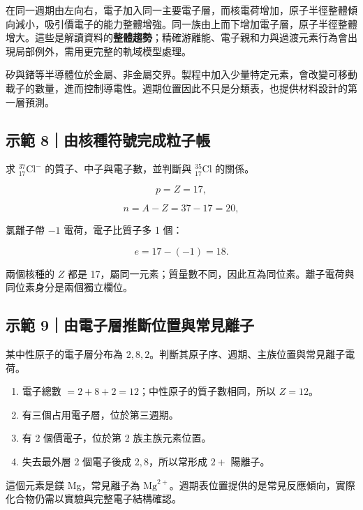 \documentclass[11pt,a4paper]{article}
\providecommand{\tightlist}{%
  \setlength{\itemsep}{0pt}\setlength{\parskip}{0pt}}
\begin{document}
在同一週期由左向右，電子加入同一主要電子層，而核電荷增加，原子半徑整體傾向減小，吸引價電子的能力整體增強。同一族由上而下增加電子層，原子半徑整體增大。這些是解讀資料的\textbf{整體趨勢}；精確游離能、電子親和力與過渡元素行為會出現局部例外，需用更完整的軌域模型處理。

矽與鍺等半導體位於金屬、非金屬交界。製程中加入少量特定元素，會改變可移動載子的數量，進而控制導電性。週期位置因此不只是分類表，也提供材料設計的第一層預測。

\begin{HandoutWorkedExample}

\subsection{示範 8｜由核種符號完成粒子帳}\label{ux793aux7bc4-8ux7531ux6838ux7a2eux7b26ux865fux5b8cux6210ux7c92ux5b50ux5e33}

求 \({}^{37}_{17}\mathrm{Cl}^{-}\) 的質子、中子與電子數，並判斷與 \({}^{35}_{17}\mathrm{Cl}\) 的關係。

\[
p=Z=17,
\]

\[
n=A-Z=37-17=20,
\]

氯離子帶 \(-1\) 電荷，電子比質子多 1 個：

\[
e=17-(-1)=18.
\]

兩個核種的 \(Z\) 都是 17，屬同一元素；質量數不同，因此互為同位素。離子電荷與同位素身分是兩個獨立欄位。

\end{HandoutWorkedExample}

\begin{HandoutWorkedExample}

\subsection{示範 9｜由電子層推斷位置與常見離子}\label{ux793aux7bc4-9ux7531ux96fbux5b50ux5c64ux63a8ux65b7ux4f4dux7f6eux8207ux5e38ux898bux96e2ux5b50}

某中性原子的電子層分布為 \(2,8,2\)。判斷其原子序、週期、主族位置與常見離子電荷。

\begin{enumerate}
\def\labelenumi{\arabic{enumi}.}
\tightlist
\item
  電子總數 \(=2+8+2=12\)；中性原子的質子數相同，所以 \(Z=12\)。
\item
  有三個占用電子層，位於第三週期。
\item
  有 2 個價電子，位於第 2 族主族元素位置。
\item
  失去最外層 2 個電子後成 \(2,8\)，所以常形成 \(2+\) 陽離子。
\end{enumerate}

這個元素是鎂 Mg，常見離子為 \(\mathrm{Mg}^{2+}\)。週期表位置提供的是常見反應傾向，實際化合物仍需以實驗與完整電子結構確認。

\end{HandoutWorkedExample}
\end{document}
